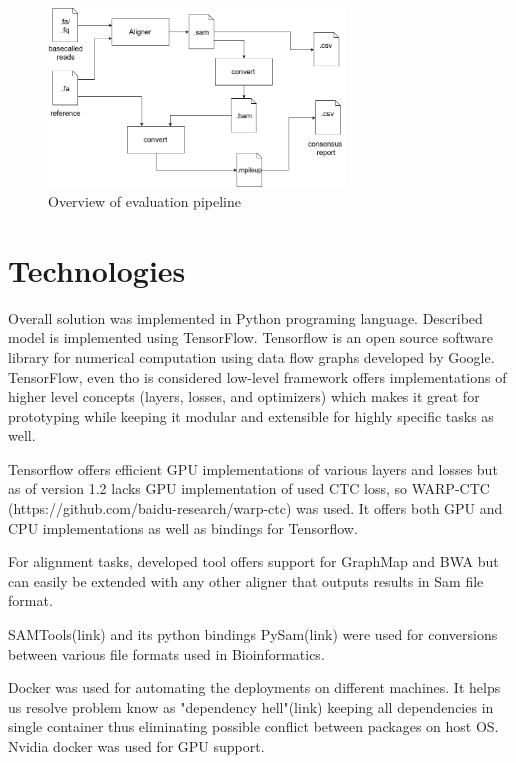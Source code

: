\documentclass[times, utf8, diplomski, numeric, english]{fer}
\begin{document}
\begin{figure}[!ht]
	\begin{center}
		\includegraphics[width=0.7\textwidth]{./imgs/evaluation_pipeline.png}
		\caption{Overview of evaluation pipeline}
		\label{fg:eval_pipe}
	\end{center}
\end{figure}

\section{Technologies}

Overall solution was implemented in Python programing language. Described model is implemented using TensorFlow. Tensorflow is an open source software library for numerical computation using data flow graphs developed by Google.  TensorFlow, even tho is considered low-level framework offers implementations of higher level concepts (layers, losses, and optimizers) which makes it great for prototyping while keeping it modular and extensible for highly specific tasks as well.

Tensorflow offers efficient GPU implementations of various layers and losses but as of version 1.2 lacks GPU implementation of used CTC loss, so WARP-CTC (https://github.com/baidu-research/warp-ctc) was used. It offers both GPU and CPU implementations as well as bindings for Tensorflow.

For alignment tasks, developed tool offers support for GraphMap and BWA but can easily be extended with any other aligner that outputs results in Sam file format.

SAMTools(link) and its python bindings PySam(link) were used for conversions between various file formats used in Bioinformatics.

Docker was used for automating the deployments on different machines. It helps us resolve problem know as  "dependency hell"(link)  keeping all dependencies in single container thus eliminating possible conflict between packages on host OS.
Nvidia docker was used for GPU support.
\end{document}
